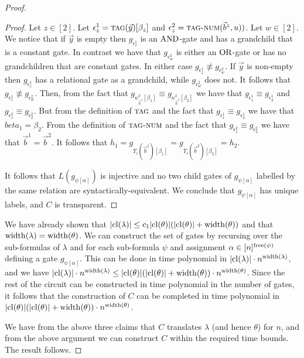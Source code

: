 \documentclass[../main/thesis.tex]{subfiles}
\begin{document}
\begin{proof}
\begin{proof}
  Let $z \in [2]$. Let $\epsilon^1_z = {\normalfont\textsc{tag}}(\vec{y})[\beta_z]$ and
  $\epsilon^2_z = {\normalfont\textsc{tag-num}}(\vec{b}^z, u))$. Let $w \in [2]$. We notice that
  if $\vec{y}$ is empty then $g_{\epsilon^1_z}$ is an $\text{\upshape AND}$-gate and has a
  grandchild that is a constant gate. In contrast we have that
  $g_{\epsilon^2_w}$ is either an $\text{\upshape OR}$-gate or has no grandchildren that are
  constant gates. In either case $g_{\epsilon^1_z} \not\equiv g_{\epsilon^2_w}$.
  If $\vec{y}$ is non-empty then $g_{\epsilon^1_z}$ has a relational gate as a
  grandchild, while $g_{\epsilon^2_w}$ does not. It follows that
  $g_{\epsilon^1_z} \not\equiv g_{\epsilon^2_w}$. Then, from the fact that
  $g_{\kappa^2_{ \vec{b}^1} [\beta_1]} \equiv g_{\kappa^2_{ \vec{b}^2}
    [\beta_2]}$ we have that $g_{\epsilon^1_1} \equiv g_{\epsilon^1_2}$ and
  $g_{\epsilon^2_1} \equiv g_{\epsilon^2_2}$. But from the definition of
  ${\normalfont\textsc{tag}}$ and the fact that $g_{\epsilon^1_1} \equiv g_{\epsilon^1_2}$ we
  have that $beta_1 = \beta_2$. From the definition of ${\normalfont\textsc{tag-num}}$ and the
  fact that $g_{\epsilon^2_1} \equiv g_{\epsilon^2_2}$ we have that $\vec{b}^1 =
  \vec{b}^2$. It follows that $h_1 = g_{\Upsilon_i(\vec{b}^1)[\beta_1]} =
  g_{\Upsilon_i(\vec{b}^2)[\beta_2]} = h_2$.

  It follows that $L(g_{\psi[\alpha]})$ is injective and no two child gates of
  $g_{\psi[\alpha]}$ labelled by the same relation are syntactically-equivalent.
  We conclude that $g_{\psi[\alpha]}$ has unique labels, and $C$ is transparent.
\end{proof}

We have already shown that $\vert \mathrm{cl}(\lambda) \vert \leq c_1\vert \mathrm{cl}(\theta)
\vert (\vert \mathrm{cl}(\theta) \vert + \mathrm{width}(\theta))$ and that $\mathrm{width}(\lambda) =
\mathrm{width}(\theta)$. We can construct the set of gates by recursing over the
sub-formulas of $\lambda$ and for each sub-formula $\psi$ and assignment $\alpha
\in [n]^{\mathrm{free}(\psi)}$ defining a gate $g_{\psi[\alpha]}$. This can be done in
time polynomial in $\vert \mathrm{cl}(\lambda) \vert \cdot n^{\mathrm{width}(\lambda)}$, and we
have $\vert \mathrm{cl}(\lambda) \vert \cdot n^{\mathrm{width}(\lambda)} \leq \vert \mathrm{cl}(\theta)
\vert (\vert \mathrm{cl}(\theta) \vert + \mathrm{width}(\theta)) \cdot n^{\mathrm{width}(\theta)}$.
Since the rest of the circuit can be constructed in time polynomial in the
number of gates, it follows that the construction of $C$ can be completed in
time polynomial in $\vert \mathrm{cl}(\theta) \vert (\vert \mathrm{cl}(\theta) \vert +
\mathrm{width}(\theta)) \cdot n^{\mathrm{width}(\theta)}$.

We have from the above three claims that $C$ translates $\lambda$ (and hence
$\theta$) for $n$, and from the above argument we can construct $C$ within the
required time bounds. The result follows.
\end{proof}
\end{document}
